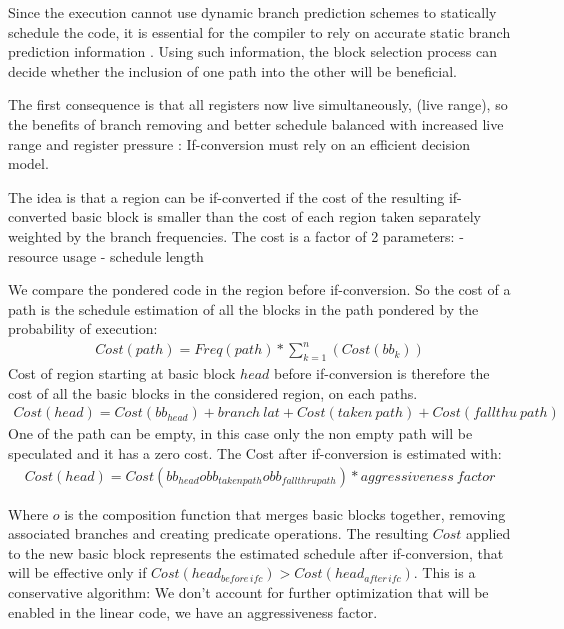 Since the execution cannot use dynamic branch prediction schemes to statically schedule the code, it is essential for the compiler to rely on accurate static branch prediction information \cite{Fisher:1992:PCB:143371.143493}. Using such information, the block selection process can decide whether the inclusion of one path into the other will be beneficial. 

The first consequence is that all registers now live simultaneously, (live range), so the benefits of branch removing and better schedule balanced with increased live range and register pressure : If-conversion must rely on an efficient decision model.

The idea is that a region can be if-converted if the cost of the resulting if-converted basic block is smaller than the cost of each region taken separately weighted by the branch frequencies. The cost is a factor of 2 parameters:
- resource usage
- schedule length

We compare the pondered code in the region before if-conversion. So the cost of a path is the schedule estimation of all the blocks in the path pondered by the probability of execution:
\begin{align}
Cost(path)=Freq(path)*\sum_{k=1}^n(Cost(bb_{k}))
\end{align}
Cost of region starting at basic block $head$ before if-conversion is therefore the cost of all the basic blocks in the considered region, on each paths.
\begin{align}
Cost(head)=Cost(bb_{head})+branch\:lat+Cost(taken\:path)+Cost(fallthu\:path)
\end{align}
One of the path can be empty, in this case only the non empty path will be speculated and it has a zero cost. The Cost after if-conversion is estimated with:
\begin{align}
Cost(head)=Cost(bb_{head} o bb_{taken path} o bb_{fallthru path}) * aggressiveness\:factor
\end{align}

Where $o$ is the composition function that merges basic blocks together, removing associated branches and creating predicate operations. The resulting $Cost$ applied to the new basic block represents the estimated schedule after if-conversion, that will be effective only if $Cost(head_{before\,ifc}) > Cost(head_{after\,ifc})$. This is a conservative algorithm: We don't account for further optimization that will be enabled in the linear code, we have an aggressiveness factor. 
 
